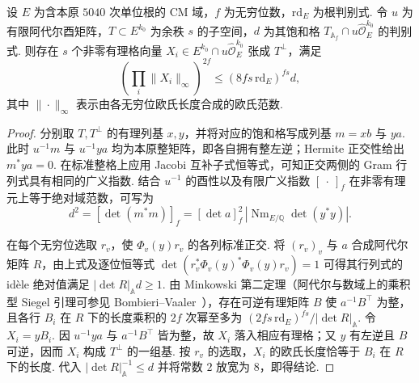 \begin{lemma}
\label{lem:b-siegel-short-basis}
\emitthmsource
设 $E$ 为含本原 $5040$ 次单位根的 CM 域，$f$ 为无穷位数，$\mathrm{rd}_E$ 为根判别式.
令 $u$ 为有限阿代尔酉矩阵，$T\subset E^{k_0}$ 为余秩 $s$ 的子空间，$d$ 为其饱和格
$T_{\mathbb A_f}\cap u\widehat{\mathcal O}_E^{k_0}$ 的判别式. 则存在 $s$ 个非零有理格向量 $X_i\in E^{k_0}\cap u\widehat{\mathcal O}_E^{k_0}$ 张成 $T^\perp$，满足
\[
 \left(\prod_i\|X_i\|_\infty\right)^{2f}\le (8fs\,\mathrm{rd}_E)^{fs}d,
\]
其中 $\|\cdot\|_\infty$ 表示由各无穷位欧氏长度合成的欧氏范数.
\end{lemma}

\begin{proof}
分别取 $T,T^\perp$ 的有理列基 $x,y$，并将对应的饱和格写成列基 $m=xb$ 与 $ya$.
此时 $u^{-1}m$ 与 $u^{-1}ya$ 均为本原整矩阵，即各自拥有整左逆；Hermite 正交性给出 $m^*ya=0$. 在标准整格上应用 Jacobi 互补子式恒等式，可知正交两侧的 Gram 行列式具有相同的广义指数. 结合 $u^{-1}$ 的酉性以及有限广义指数 $[\ \cdot\ ]_f$ 在非零有理元上等于绝对域范数，可写为
\[
 d^2=[\det(m^*m)]_f=[\det a]_f^2\,|\operatorname{Nm}_{E/\mathbb Q}\det(y^*y)|.
\]

在每个无穷位选取 $r_v$，使 $\Phi_v(y)r_v$ 的各列标准正交. 将 $(r_v)_v$ 与 $a$ 合成阿代尔矩阵 $R$，由上式及逐位恒等式 $\det(r_v^*\Phi_v(y)^*\Phi_v(y)r_v)=1$ 可得其行列式的 idèle 绝对值满足 $|\det R|_{\mathbb A}d\ge 1$.
由 Minkowski 第二定理（阿代尔与数域上的乘积型 Siegel 引理可参见 Bombieri--Vaaler~\cite{BombieriVaaler1983}），存在可逆有理矩阵 $B$ 使 $a^{-1}B^\top$ 为整，且各行 $B_i$ 在 $R$ 下的长度乘积的 $2f$ 次幂至多为 $(2fs\,\mathrm{rd}_E)^{fs}/|\det R|_{\mathbb A}$. 令 $X_i=yB_i$. 因 $u^{-1}ya$ 与 $a^{-1}B^\top$ 皆为整，故 $X_i$ 落入相应有理格；又 $y$ 有左逆且 $B$ 可逆，因而 $X_i$ 构成 $T^\perp$ 的一组基. 按 $r_v$ 的选取，$X_i$ 的欧氏长度恰等于 $B_i$ 在 $R$ 下的长度. 代入 $|\det R|_{\mathbb A}^{-1}\le d$ 并将常数 $2$ 放宽为 $8$，即得结论.
\end{proof}

